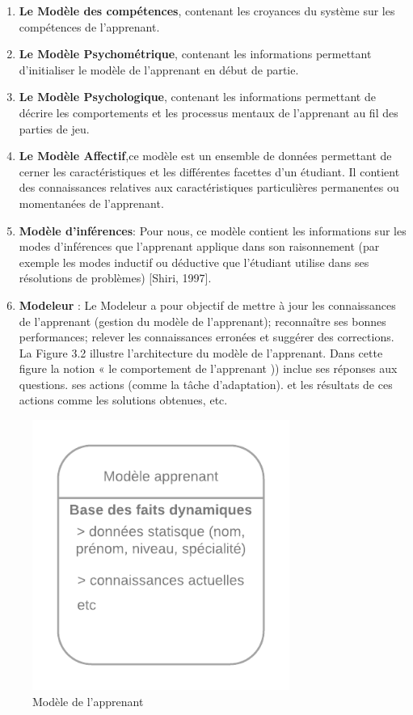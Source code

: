 \begin{enumerate}
\item  \textbf{Le Modèle des compétences}, contenant les croyances du système sur les compétences de l'apprenant. 
\item \textbf{Le Modèle Psychométrique}, contenant les informations permettant d'initialiser le modèle de l'apprenant en début de partie.
\item \textbf{Le Modèle Psychologique}, contenant les informations permettant de décrire les comportements et les processus mentaux de l'apprenant au fil des parties de jeu. 
\item \textbf{Le Modèle Affectif},ce modèle est un ensemble de données permettant de cerner les caractéristiques et les différentes facettes d'un étudiant. Il contient des connaissances relatives aux caractéristiques particulières permanentes ou momentanées de l'apprenant.
\item \textbf{Modèle d'inférences}: Pour nous, ce modèle contient les informations sur les modes d'inférences que l'apprenant applique dans son raisonnement (par exemple les modes inductif ou déductive que l'étudiant utilise dans ses résolutions de problèmes) [Shiri, 1997].
\item \textbf{Modeleur} : Le Modeleur a pour objectif de mettre à jour les connaissances de l'apprenant (gestion du modèle de l'apprenant); reconnaître ses bonnes performances; relever les connaissances erronées et suggérer des corrections. La Figure 3.2 illustre l'architecture du modèle de l'apprenant. Dans cette figure la notion « le comportement de l'apprenant )) inclue ses réponses aux questions. ses actions (comme la tâche d'adaptation). et les résultats de ces actions comme les solutions obtenues, etc.
\end{enumerate}
\begin{figure}
    \centering
    \includegraphics[width=0.75\textwidth]{figures/mod_app.png}
    \captionsetup{justification=centering}
    \caption{ Modèle de l'apprenant }
 \label{fig:m_app}
\end{figure}
